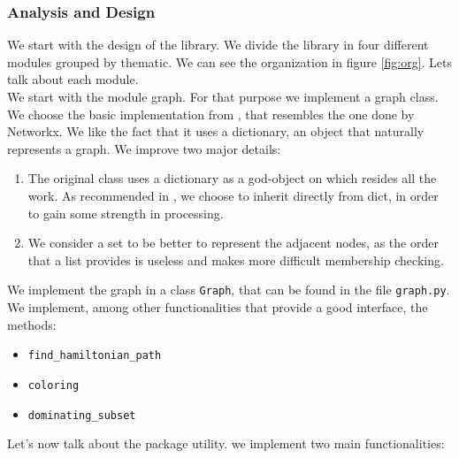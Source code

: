\subsubsection{Analysis and Design}

We start with the design of the library. We divide the library in four different modules grouped by thematic. We can see the organization in figure \ref{fig:org}. Lets talk about each module.\\






We start with the module graph. For that purpose we implement a graph class.  We choose the basic implementation from \cite{graphAdvanced}, that resembles the one done by Networkx. We like the fact that it uses a dictionary, an object that naturally represents a graph. We improve two major details:
  \begin{enumerate}
  \item The original class uses a dictionary as a god-object on which resides all the work. As recommended in \cite{slatkin2019effective}, we choose to inherit directly from dict, in order to gain some strength in processing.
  \item We consider a set to be better to represent the adjacent nodes, as the order that a list provides is useless and makes more difficult membership checking.
  \end{enumerate}

  We implement the graph in a class \texttt{Graph}, that can be found in the file \texttt{graph.py}. We implement, among other functionalities that provide a good interface, the  methods:
  \begin{itemize}
  \item \texttt{find\_hamiltonian\_path}
  \item \texttt{coloring}
  \item \texttt{dominating\_subset}
  \end{itemize}


  Let's now talk about the package utility. we implement two main functionalities:

